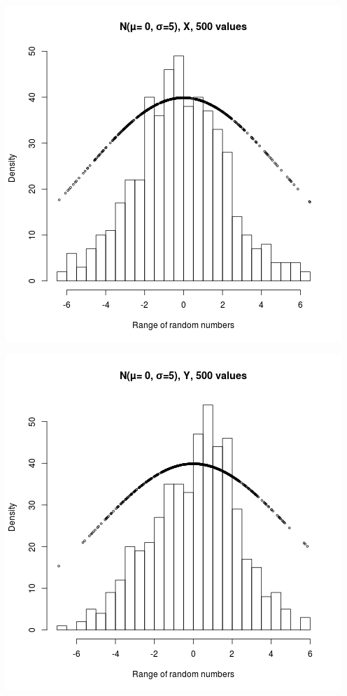 \documentclass{article}
\begin{document}
\includegraphics{"plot3_1_X"}
\pagebreak

\includegraphics{"plot3_1_Y"}
\pagebreak
\end{document}
